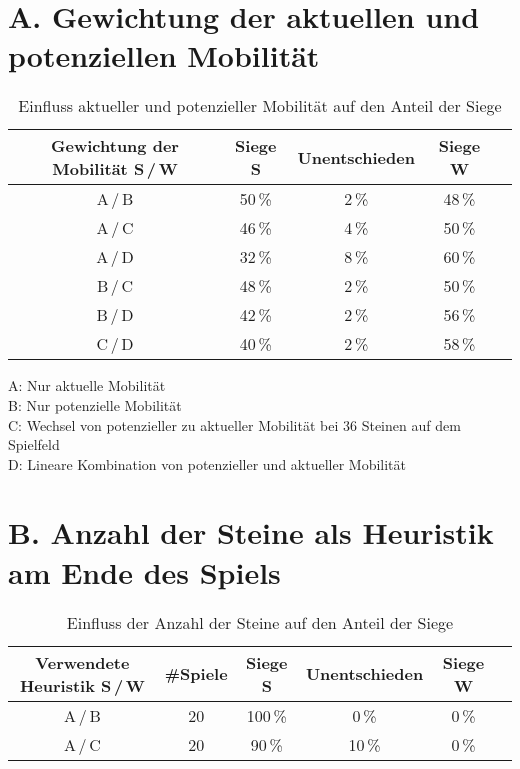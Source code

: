 
\addchap{\langanhang}

\section*{A. Gewichtung der aktuellen und potenziellen Mobilität}
 
\setcounter{table}{0}
\renewcommand{\thetable}{A\arabic{table}}

\begin{table}[hb]
\centering
\begin{tabular}{c|cccc}
\hline
Gewichtung der Mobilität S\,/\,W & Siege S & Unentschieden & Siege W \\
\hline
 A\,/\,B & 50\,\% &  2\,\% & 48\,\% \\
 A\,/\,C & 46\,\% &  4\,\% & 50\,\% \\
 A\,/\,D & 32\,\% &  8\,\% & 60\,\% \\
 B\,/\,C & 48\,\% &  2\,\% & 50\,\% \\
 B\,/\,D & 42\,\% &  2\,\% & 56\,\% \\
 C\,/\,D & 40\,\% &  2\,\% & 58\,\% \\
\hline
\end{tabular}
\caption{Einfluss aktueller und potenzieller Mobilität auf den Anteil der Siege}
\label{table:mobility}
\end{table}

\small{
A: Nur aktuelle Mobilität \\
B: Nur potenzielle Mobilität \\
C: Wechsel von potenzieller zu aktueller Mobilität bei 36 Steinen auf dem Spielfeld \\
D: Lineare Kombination von potenzieller und aktueller Mobilität}

\pagebreak

\section*{B. Anzahl der Steine als Heuristik am Ende des Spiels}
 
\setcounter{table}{0}
\renewcommand{\thetable}{B\arabic{table}}

\begin{table}[hb]
\centering
\begin{tabular}{c|ccccc}
\hline
Verwendete Heuristik S\,/\,W & \#Spiele & Siege S & Unentschieden & Siege W \\
\hline
 A\,/\,B & 20 &100\,\% &  0\,\% & 0\,\% \\
 A\,/\,C & 20 & 90\,\% & 10\,\% & 0\,\% \\
\hline
\end{tabular}
\caption{Einfluss der Anzahl der Steine auf den Anteil der Siege}
\label{table:disccount}
\end{table}

